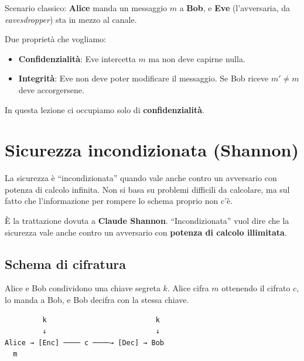 Scenario classico: \textbf{Alice} manda un messaggio \(m\) a \textbf{Bob}, e \textbf{Eve} (l'avversaria, da \emph{eavesdropper}) sta in mezzo al canale.

Due proprietà che vogliamo:

\begin{itemize}
\tightlist
\item
  \textbf{Confidenzialità}: Eve intercetta \(m\) ma non deve capirne nulla.
\item
  \textbf{Integrità}: Eve non deve poter modificare il messaggio. Se Bob riceve \(m' \ne m\) deve accorgersene.
\end{itemize}

\begin{nota}

In questa lezione ci occupiamo solo di \textbf{confidenzialità}.

\end{nota}

\section{Sicurezza incondizionata (Shannon)}

\begin{inbreve}

La sicurezza è ``incondizionata'' quando vale anche contro un avversario con potenza di calcolo infinita. Non si basa su problemi difficili da calcolare, ma sul fatto che l'informazione per rompere lo schema proprio non c'è.

\end{inbreve}

È la trattazione dovuta a \textbf{Claude Shannon}. ``Incondizionata'' vuol dire che la sicurezza vale anche contro un avversario con \textbf{potenza di calcolo illimitata}.

\subsection{Schema di cifratura}

Alice e Bob condividono una chiave segreta \(k\). Alice cifra \(m\) ottenendo il cifrato \(c\), lo manda a Bob, e Bob decifra con la stessa chiave.

\begin{verbatim}
         k                          k
         ↓                          ↓
Alice → [Enc] ──── c ────→ [Dec] → Bob
  m
\end{verbatim}

